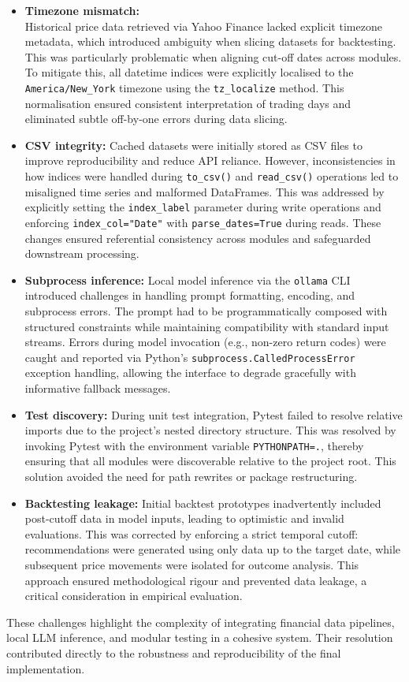 \begin{itemize}

\item \textbf{Timezone mismatch:}\\
Historical price data retrieved via Yahoo Finance lacked explicit timezone metadata, which introduced ambiguity when slicing datasets for backtesting. This was particularly problematic when aligning cut-off dates across modules. To mitigate this, all datetime indices were explicitly localised to the \texttt{America/New\_York} timezone using the \texttt{tz\_localize} method. This normalisation ensured consistent interpretation of trading days and eliminated subtle off-by-one errors during data slicing.

\item \textbf{CSV integrity:}
Cached datasets were initially stored as CSV files to improve reproducibility and reduce API reliance. However, inconsistencies in how indices were handled during \texttt{to\_csv()} and \texttt{read\_csv()} operations led to misaligned time series and malformed DataFrames. This was addressed by explicitly setting the \texttt{index\_label} parameter during write operations and enforcing \texttt{index\_col="Date"} with \texttt{parse\_dates=True} during reads. These changes ensured referential consistency across modules and safeguarded downstream processing.

\item \textbf{Subprocess inference:}
Local model inference via the \texttt{ollama} CLI introduced challenges in handling prompt formatting, encoding, and subprocess errors. The prompt had to be programmatically composed with structured constraints while maintaining compatibility with standard input streams. Errors during model invocation (e.g., non-zero return codes) were caught and reported via Python’s \texttt{subprocess.CalledProcessError} exception handling, allowing the interface to degrade gracefully with informative fallback messages.

\item \textbf{Test discovery:}
During unit test integration, Pytest failed to resolve relative imports due to the project’s nested directory structure. This was resolved by invoking Pytest with the environment variable \texttt{PYTHONPATH=.}, thereby ensuring that all modules were discoverable relative to the project root. This solution avoided the need for path rewrites or package restructuring.

\item \textbf{Backtesting leakage:}
Initial backtest prototypes inadvertently included post-cutoff data in model inputs, leading to optimistic and invalid evaluations. This was corrected by enforcing a strict temporal cutoff: recommendations were generated using only data up to the target date, while subsequent price movements were isolated for outcome analysis. This approach ensured methodological rigour and prevented data leakage, a critical consideration in empirical evaluation.

\end{itemize}

These challenges highlight the complexity of integrating financial data pipelines, local LLM inference, and modular testing in a cohesive system. Their resolution contributed directly to the robustness and reproducibility of the final implementation.